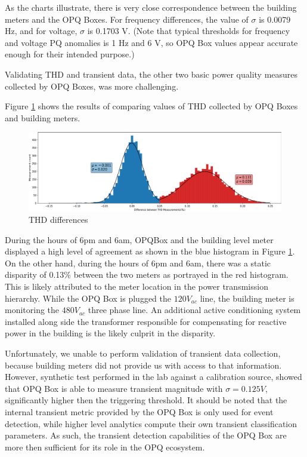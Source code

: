 As the charts illustrate, there is very close correspondence between the building meters and the OPQ Boxes. For frequency differences, the value of $\sigma$ is 0.0079 Hz, and for voltage, $\sigma$ is 0.1703 V. (Note that typical thresholds for frequency and voltage PQ anomalies is 1 Hz and 6 V, so OPQ Box values appear accurate enough for their intended purpose.)

Validating THD and transient data, the other two basic power quality measures collected by OPQ Boxes, was more challenging.

Figure \ref{fig:opqbox-thd-validation} shows the results of comparing values of THD collected by OPQ Boxes and building meters.

\begin{figure}[ht]
  \centering
	\includegraphics[width=0.8\linewidth]{images/pilot/opqbox-thd-validation.png}
	\caption{THD differences}
	\label{fig:opqbox-thd-validation}
\end{figure}

During the hours of 6pm and 6am, OPQBox and the building level meter displayed a high level of agreement as shown in the blue histogram in Figure \ref{fig:opqbox-thd-validation}.
On the other hand, during the hours of 6pm and 6am, there was a static disparity of 0.13\% between the two meters as portrayed  in the red histogram.
This is likely attributed to the meter location in the power transmission hierarchy.
While the OPQ Box is plugged the $120V_{ac}$ line, the building meter is monitoring the $480V_{ac}$ three phase line.
An additional active conditioning system installed along side the transformer responsible for compensating for reactive power in the building is the likely culprit in the disparity.

Unfortunately, we unable to perform validation of transient data collection, because building meters did not provide us with access to that information. 
However, synthetic test performed in the lab against a calibration source, showed that OPQ Box is able to measure transient magnitude with $\sigma=0.125V$, significantly higher then the triggering threshold.
It should be noted that the internal transient metric provided by the OPQ Box is only used for event detection, while higher level analytics compute their own transient classification parameters.
As such, the transient detection capabilities of the OPQ Box are more then sufficient for its role in the OPQ ecosystem.

